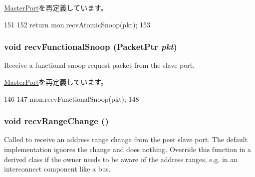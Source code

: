 \hyperlink{classMasterPort_ae1160d8f94f042aba1dc9a07a72e1e82}{MasterPort}を再定義しています。


\begin{DoxyCode}
151         {
152             return mon.recvAtomicSnoop(pkt);
153         }
\end{DoxyCode}
\hypertarget{classCommMonitor_1_1MonitorMasterPort_a284dfb90c168233c9d416bc07de8fefe}{
\subsubsection[{recvFunctionalSnoop}]{\setlength{\rightskip}{0pt plus 5cm}void recvFunctionalSnoop ({\bf PacketPtr} {\em pkt})}}
\label{classCommMonitor_1_1MonitorMasterPort_a284dfb90c168233c9d416bc07de8fefe}
Receive a functional snoop request packet from the slave port. 

\hyperlink{classMasterPort_af5b15bc08781cf0ba6190efc37d5b67e}{MasterPort}を再定義しています。


\begin{DoxyCode}
146         {
147             mon.recvFunctionalSnoop(pkt);
148         }
\end{DoxyCode}
\hypertarget{classCommMonitor_1_1MonitorMasterPort_aecf310a01b533ae8700eccac2cf20480}{
\subsubsection[{recvRangeChange}]{\setlength{\rightskip}{0pt plus 5cm}void recvRangeChange ()}}
\label{classCommMonitor_1_1MonitorMasterPort_aecf310a01b533ae8700eccac2cf20480}
Called to receive an address range change from the peer slave port. The default implementation ignores the change and does nothing. Override this function in a derived class if the owner needs to be aware of the address ranges, e.g. in an interconnect component like a bus. 

